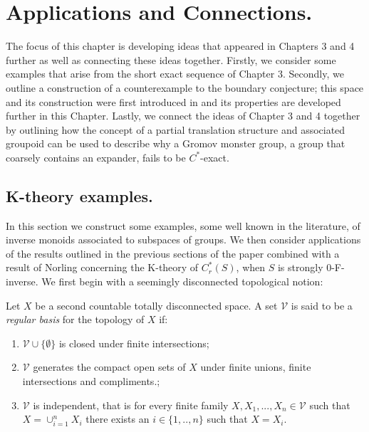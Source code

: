 \chapter{Applications and Connections.}
The focus of this chapter is developing ideas that appeared in Chapters 3 and 4 further as well as connecting these ideas together. Firstly, we consider some examples that arise from the short exact sequence of Chapter 3. Secondly, we outline a construction of a counterexample to the boundary conjecture; this space and its construction were first introduced in \cite{MR2363697} and its properties are developed further in this Chapter. Lastly, we connect the ideas of Chapter 3 and 4 together by outlining how the concept of a partial translation structure and associated groupoid can be used to describe why a Gromov monster group, a group that coarsely contains an expander, fails to be $C^{*}$-exact. 

\section{K-theory examples.}\label{sect:K-theory}

In this section we construct some examples, some well known in the literature, of inverse monoids associated to subspaces of groups. We then consider applications of the results outlined in the previous sections of the paper combined with a result of Norling \cite{Nor-2012} concerning the K-theory of $C^{*}_{r}(S)$, when $S$ is strongly 0-F-inverse. We first begin with a seemingly disconnected topological notion:

\begin{definition}
Let $X$ be a second countable totally disconnected space. A set $\mathcal{V}$ is said to be a \textit{regular basis} for the topology of $X$ if:
\begin{enumerate}
\item $\mathcal{V}\cup \lbrace \emptyset \rbrace$ is closed under finite intersections; 
\item $\mathcal{V}$ generates the compact open sets of $X$ under finite unions, finite intersections and compliments.;
\item $\mathcal{V}$ is independent, that is for every finite family $X,X_{1},...,X_{n} \in \mathcal{V}$ such that $X = \cup_{i=1}^{n} X_{i}$ there exists an $i \in \lbrace 1,..,n \rbrace$ such that $X=X_{i}$.
\end{enumerate}
\end{definition}

